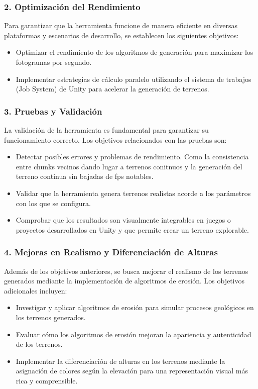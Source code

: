 \subsubsection{2. Optimización del Rendimiento}

Para garantizar que la herramienta funcione de manera eficiente en diversas plataformas y escenarios de desarrollo, se establecen los siguientes objetivos:

\begin{itemize}
    \item Optimizar el rendimiento de los algoritmos de generación para maximizar los fotogramas por segundo.
    \item Implementar estrategias de cálculo paralelo utilizando el sistema de trabajos (Job System) de Unity para acelerar la generación de terrenos.
\end{itemize}

\subsubsection{3. Pruebas y Validación}

La validación de la herramienta es fundamental para garantizar su funcionamiento correcto. Los objetivos relacionados con las pruebas son:

\begin{itemize}
    \item Detectar posibles errores y problemas de rendimiento. Como la consistencia entre chunks vecinos dando lugar a terrenos conitnuos y la generación del terreno continua sin bajadas de fps notables.
    \item Validar que la herramienta genera terrenos realistas acorde a los parámetros con los que se configura.
    \item Comprobar que los resultados son visualmente integrables en juegos o proyectos desarrollados en Unity y que permite crear un terreno explorable.
\end{itemize}

\subsubsection{4. Mejoras en Realismo y Diferenciación de Alturas}

Además de los objetivos anteriores, se busca mejorar el realismo de los terrenos generados mediante la implementación de algoritmos de erosión. Los objetivos adicionales incluyen:

\begin{itemize}
    \item Investigar y aplicar algoritmos de erosión para simular procesos geológicos en los terrenos generados.
    \item Evaluar cómo los algoritmos de erosión mejoran la apariencia y autenticidad de los terrenos.
    \item Implementar la diferenciación de alturas en los terrenos mediante la asignación de colores según la elevación para una representación visual más rica y comprensible.
\end{itemize}

